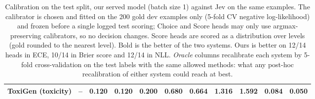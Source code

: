\begin{table}[t]
\begin{tabular}{llrrrrrrrrr}
ToxiGen (toxicity) & -- & 0.120 & \textbf{0.120} & 0.200 & 0.680 & \textbf{0.664} & \textbf{1.316} & 1.592 & 0.084 & 0.050 \\
\bottomrule
\end{tabular}
\caption{Calibration on the test split, our served model (batch size 1) against Jev on the same examples. The calibrator is chosen and fitted on the 200 gold dev examples only (5-fold CV negative log-likelihood) and frozen before a single logged test scoring; Choice and Score heads may only use argmax-preserving calibrators, so no decision changes. Score heads are scored as a distribution over levels (gold rounded to the nearest level). Bold is the better of the two systems. Ours is better on 12/14 heads in ECE, 10/14 in Brier score and 12/14 in NLL. \emph{Oracle} columns recalibrate each system by 5-fold cross-validation on the test labels with the same allowed methods: what any post-hoc recalibration of either system could reach at best.}
\label{tab:cal}
\end{table}
